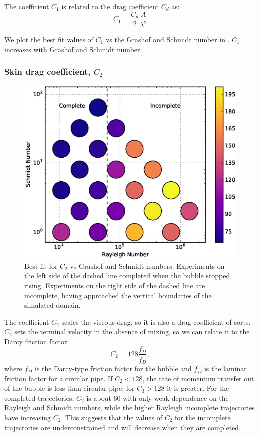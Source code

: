 The coefficient $C_1$ is related to the drag coefficient $C_d$ as:
\begin{equation}
C_1 = \frac{C_d}{2} \frac{A}{\lambda^2}
\end{equation}

We plot the best fit values of $C_1$ vs the Grashof and Schmidt number in .
$C_1$ increases with Grashof and Schmidt number.

\subsubsection{Skin drag coefficient, $C_2$}
\begin{figure}
\includegraphics[width=\columnwidth]{figs/C2-vs-Rayleigh-Schmidt}
\caption{ 
  Best fit for $C_2$ vs Grashof and Schmidt numbers.
  Experiments on the left side of the dashed line completed when the bubble stopped rising.
  Experiments on the right side of the dashed line are incomplete, having approached the vertical boundaries of the simulated domain.
}
\end{figure}

The coefficient $C_2$ scales the viscous drag, so it is also a drag coefficient of sorts.
$C_2$ sets the terminal velocity in the absence of mixing, so we can relate it to the Darcy friction factor:
\begin{equation}
C_2 = 128 \frac{f_D}{\bar{f}_D},
\end{equation}
where $f_D$ is the Darcy-type friction factor for the bubble and $\bar{f}_D$ is the laminar friction factor for a circular pipe.
If $C_2 < 128$, the rate of momentum transfer out of the bubble is less than circular pipe; for $C_3 > 128$ it is greater.
For the completed trajectories, $C_2$ is about $60$ with only weak dependence on the Rayleigh and Schmidt numbers, while the higher Rayleigh incomplete trajectories have increasing $C_2$.
This suggests that the values of $C_2$ for the incomplete trajectories are underconstrained and will decrease when they are completed.


